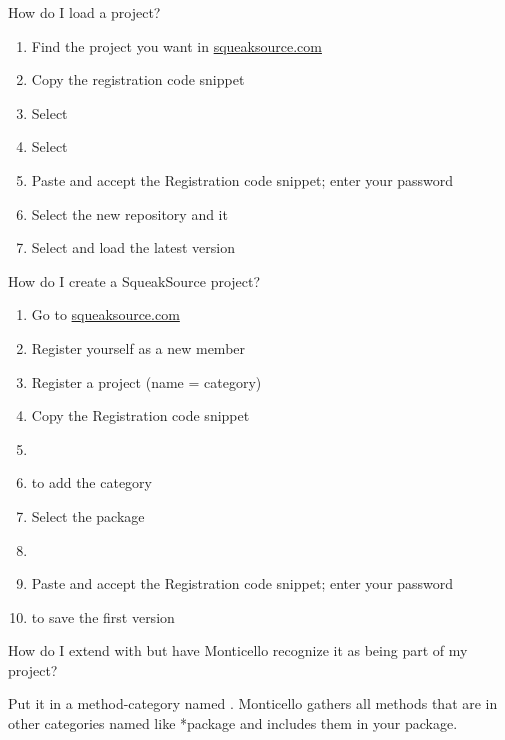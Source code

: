 \documentclass[a4paper,10pt,twoside]{book}
\begin{document}
\begin{faq}
How do I load a  project?
\end{faq}
\answer
\begin{enumerate}
  \item Find the project you want in \url{squeaksource.com}
  \item Copy the registration code snippet
  \item Select 
  \item Select 
  \item Paste and accept the Registration code snippet; enter your password
  \item Select the new repository and  it
  \item Select and load the latest version
\end{enumerate}

\begin{faq}
How do I create a SqueakSource project?
\end{faq}
\answer
\begin{enumerate}
  \item Go to \url{squeaksource.com}
  \item Register yourself as a new member
  \item Register a project (name = category)
  \item Copy the Registration code snippet
  \item {}
  \item {} to add the category
  \item Select the package
  \item {}
  \item Paste and accept the Registration code snippet; enter your password
  \item {} to save the first version
\end{enumerate}

\begin{faq}
How do I extend  with  but have Monticello recognize it as being part of my  project?
\end{faq}
\answer
Put it in a method-category named .
Monticello gathers all methods that are in other categories named like *package and includes them in your package.

\end{document}
